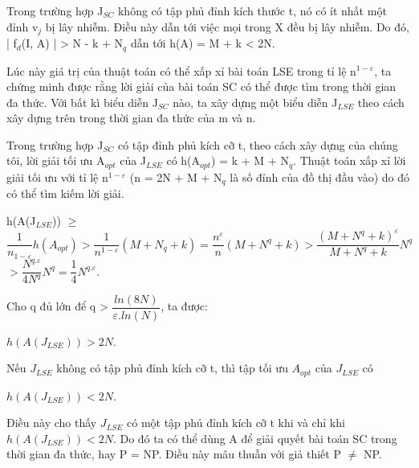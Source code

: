  		Trong trường hợp J$_{SC}$ không có tập phủ đỉnh kích thước t, nó có ít nhất một đỉnh v$_{j}$ bị lây nhiễm. Điều này dẫn tới việc mọi trong X đều bị lây nhiễm. Do đó, | f$_{d}$(I, A) | > N - k + N$_{q}$ dẫn tới h(A) = M  + k < 2N.
 		
 		Lúc này giá trị của thuật toán có thể xấp xỉ bài toán LSE trong tỉ lệ n$^{1 - \varepsilon}$, ta chứng minh được rằng lời giải của bài toán SC có thể được tìm trong thời gian đa thức. Với bất kì biểu diễn J$_{SC}$ nào, ta xây dựng một biểu diễn J$_{LSE}$ theo cách xây dựng trên trong thời gian đa thức của m và n. 
 		
 		Trong trường hợp J$_{SC}$ có tập đỉnh phủ kích cỡ t, theo cách xây dựng của chúng tôi, lời giải tối ưu A$_{opt}$ của J$_{LSE}$ có h(A$_{opt}$) = k + M + N$_{q}$. Thuật toán xấp xỉ lời giải tối ưu với tỉ lệ n$^{1 - \varepsilon}$ (n = 2N + M + N$_{q}$ là số đỉnh của đồ thị đầu vào) do đó có thể tìm kiếm lời giải. 
 		
 			h(A(J$_{LSE}$)) $\geq$ $\dfrac{1}{n_{1 - \varepsilon}} h(A_{opt}) > \dfrac{1}{n^{1 - \varepsilon}}(M + N_{q} +k) = \dfrac{n^{\varepsilon}}{n}(M + N^{q} +k) > \dfrac{(M + N^{q} + k)^{\varepsilon}}{M + N^{q} + k}N^{q}$$> \dfrac{N^{q.\varepsilon}}{4N^{q}}N^{q} = \dfrac{1}{4}N^{q.\varepsilon}$. 
 		
 		Cho q đủ lớn để q > $\dfrac{ln(8N)}{\varepsilon.ln(N)}$, ta được: 
 		\begin{center}
			$h(A(J_{LSE})) > 2N$.
 		\end{center}
 	
 		Nếu $J_{LSE}$ không có tập phủ đỉnh kích cỡ t, thì tập tối ưu $A_{opt}$ của $J_{LSE}$ có 
 		\begin{center}
 			$h(A(J_{LSE})) < 2N$.
 		\end{center}
 	
 		Điều này cho thấy $J_{LSE}$ có một tập phủ đỉnh kích cỡ t khi và chỉ khi $h(A(J_{LSE})) < 2N$. Do đó ta có thể dùng A để giải quyết bài toán SC trong thời gian đa thức, hay P = NP. Điều này mâu thuẫn với giả thiết P $\neq$ NP.
 		
